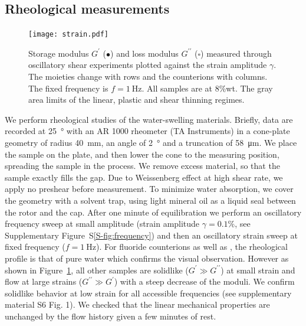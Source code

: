 \documentclass[journal=jacsat,manuscript=article]{achemso}
\begin{document}

\subsection{Rheological measurements}
\begin{figure}[t]
\texttt{[image: strain.pdf]}%
\caption{Storage modulus $G^\prime$ ($\bullet$) and loss modulus $G^{\prime\prime}$ ($\square$) measured through oscillatory shear experiments plotted against the strain amplitude $\gamma$. The moieties change with rows and the counterions with columns. The fixed frequency is $f=\SI{1}{\hertz}$. All samples are at 8\%wt. The gray area limits of the linear, plastic and shear thinning regimes.}%
\label{fig:strain}%
\end{figure}

We perform rheological studies of the water-swelling materials. Briefly, data are recorded at \SI{25}{\degree} with an AR 1000 rheometer (TA Instruments) in a cone-plate geometry of radius \SI{40}{\milli\metre}, an angle of \SI{2}{\degree} and a truncation of \SI{58}{\micro\metre}\cite{Macosko1994,Larson1999}. We place the sample on the plate, and then lower the cone to the measuring position, spreading the sample in the process. We remove excess material, so that the sample exactly fills the gap. Due to Weissenberg effect at high shear rate, we apply no preshear before measurement. To minimize water absorption, we cover the geometry with a solvent trap, using light mineral oil as a liquid seal between the rotor and the cap. After one minute of equilibration we perform an oscillatory frequency sweep at small amplitude (strain amplitude $\gamma=0.1\%$, see Supplementary Figure~S\ref{S-fig:frequency}) and then an oscillatory strain sweep at fixed frequency ($f=\SI{1}{\hertz}$). For fluoride counterions as well as , the rheological profile is that of pure water which confirms the visual observation. However as shown in Figure~\ref{fig:strain}, all other samples are solidlike ($G^\prime \gg G^{\prime\prime}$) at small strain and flow at large strains ($G^{\prime\prime} \gg G^\prime$) with a steep decrease of the moduli. We confirm solidlike behavior at low strain for all accessible frequencies (see supplementary material S6 Fig. 1). We checked that the linear mechanical properties are unchanged by the flow history given a few minutes of rest.
\end{document}
